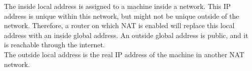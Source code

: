 

The inside local address is assigned to a machine inside a network. This IP address is unique within this network, but might not be unique outside of the network.
Therefore, a router on which NAT is enabled will replace this local address with an inside global address.
An outside global address is public, and it is reachable through the internet. \\
The outside local address is the real IP address of the machine in another NAT network.